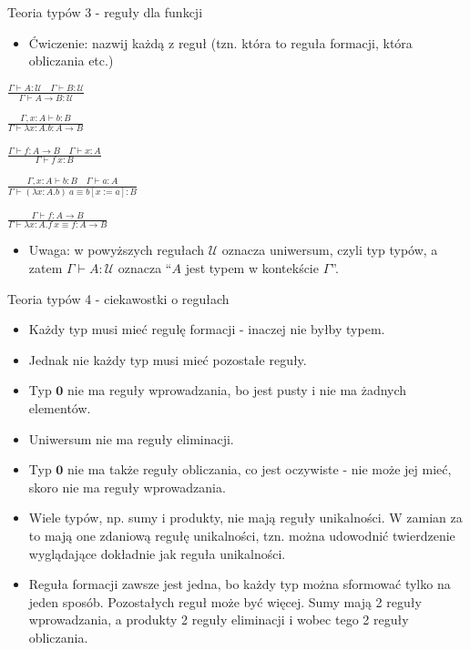\documentclass{beamer}
\newcommand{\U}{\mathcal{U}}
\begin{document}
\begin{frame}{Teoria typów 3 - reguły dla funkcji}

\begin{itemize}
	\item Ćwiczenie: nazwij każdą z reguł (tzn. która to reguła formacji, która obliczania etc.)
\end{itemize}

\begin{center}
	$\displaystyle \frac{\Gamma \vdash A : \U \quad \Gamma \vdash B : \U}{\Gamma \vdash A \to B : \U}$
\end{center}
\begin{center}
	$\displaystyle \frac{\Gamma, x : A \vdash b : B}{\Gamma \vdash \lambda x:A.b : A \to B}$
\end{center}
\begin{center}
	$\displaystyle \frac{\Gamma \vdash f : A \to B \quad \Gamma \vdash x : A}{\Gamma \vdash f\ x : B}$
\end{center}
\begin{center}
	$\displaystyle \frac{\Gamma, x : A \vdash b : B \quad \Gamma \vdash a : A}{\Gamma \vdash (\lambda x:A.b)\ a \equiv b[x := a] : B}$
\end{center}
\begin{center}
	$\displaystyle \frac{\Gamma \vdash f : A \to B}{\Gamma \vdash \lambda x:A.f\ x \equiv f : A \to B}$
\end{center}

\begin{itemize}
	\item Uwaga: w powyższych regułach $\U$ oznacza uniwersum, czyli typ typów, a zatem $\Gamma \vdash A : \U$ oznacza ``$A$ jest typem w kontekście $\Gamma$''.
\end{itemize}

\end{frame}

\begin{frame}{Teoria typów 4 - ciekawostki o regułach}
\begin{itemize}
	\item Każdy typ musi mieć regułę formacji - inaczej nie byłby typem.
	\item Jednak nie każdy typ musi mieć pozostałe reguły.
	\item Typ $\textbf{0}$ nie ma reguły wprowadzania, bo jest pusty i nie ma żadnych elementów.
	\item Uniwersum nie ma reguły eliminacji.
	\item Typ $\textbf{0}$ nie ma także reguły obliczania, co jest oczywiste - nie może jej mieć, skoro nie ma reguły wprowadzania.
	\item Wiele typów, np. sumy i produkty, nie mają reguły unikalności. W zamian za to mają one zdaniową regułę unikalności, tzn. można udowodnić twierdzenie wyglądające dokładnie jak reguła unikalności.
	\item Reguła formacji zawsze jest jedna, bo każdy typ można sformować tylko na jeden sposób. Pozostałych reguł może być więcej. Sumy mają 2 reguły wprowadzania, a produkty 2 reguły eliminacji i wobec tego 2 reguły obliczania.
\end{itemize}
\end{frame}
\end{document}

